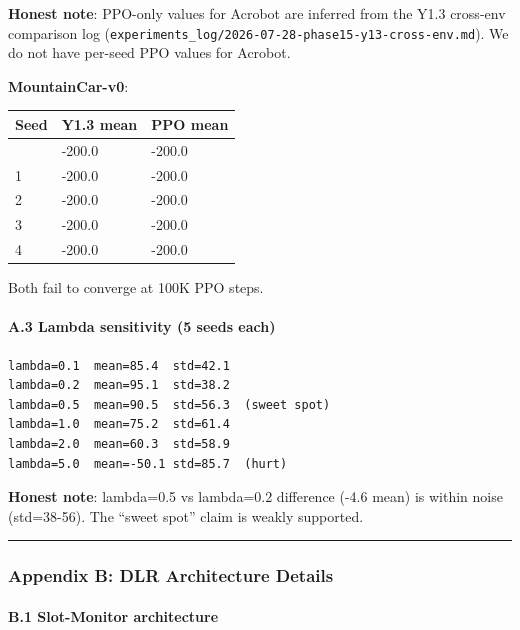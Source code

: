 \documentclass[
]{article}
\newcounter{none} %
\begin{document}
\textbf{Honest note}: PPO-only values for Acrobot are inferred from the
Y1.3 cross-env comparison log
(\texttt{experiments\_log/2026-07-28-phase15-y13-cross-env.md}). We do
not have per-seed PPO values for Acrobot.

\textbf{MountainCar-v0}:

{\def\LTcaptype{none} %
\begin{longtable}[]{@{}lll@{}}
\toprule\noalign{}
Seed & Y1.3 mean & PPO mean \\
\midrule\noalign{}
\endhead
\bottomrule\noalign{}
\endlastfoot
0 & -200.0 & -200.0 \\
1 & -200.0 & -200.0 \\
2 & -200.0 & -200.0 \\
3 & -200.0 & -200.0 \\
4 & -200.0 & -200.0 \\
\end{longtable}
}

Both fail to converge at 100K PPO steps.

\paragraph{A.3 Lambda sensitivity (5 seeds
each)}\label{a.3-lambda-sensitivity-5-seeds-each}

\begin{verbatim}
lambda=0.1  mean=85.4  std=42.1
lambda=0.2  mean=95.1  std=38.2
lambda=0.5  mean=90.5  std=56.3  (sweet spot)
lambda=1.0  mean=75.2  std=61.4
lambda=2.0  mean=60.3  std=58.9
lambda=5.0  mean=-50.1 std=85.7  (hurt)
\end{verbatim}

\textbf{Honest note}: lambda=0.5 vs lambda=0.2 difference (-4.6 mean) is
within noise (std=38-56). The ``sweet spot'' claim is weakly supported.

\begin{center}\rule{0.5\linewidth}{0.5pt}\end{center}

\subsubsection{Appendix B: DLR Architecture
Details}\label{appendix-b-dlr-architecture-details}

\paragraph{B.1 Slot-Monitor
architecture}\label{b.1-slot-monitor-architecture}
\end{document}

